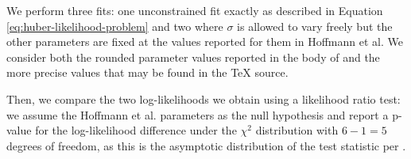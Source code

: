 \documentclass[twocolumn]{article}
\begin{document}
We perform three fits: one unconstrained fit exactly as described in Equation \ref{eq:huber-likelihood-problem} and two where \( \sigma \) is allowed to vary freely but the other parameters are fixed at the values reported for them in Hoffmann et al. We consider both the rounded parameter values reported in the body of \cite{hoffmann2022training} and the more precise values that may be found in the TeX source.

Then, we compare the two log-likelihoods we obtain using a likelihood ratio test: we assume the Hoffmann et al. parameters as the null hypothesis and report a p-value for the log-likelihood difference under the \( \chi^2 \) distribution with \( 6-1 = 5 \) degrees of freedom, as this is the asymptotic distribution of the test statistic per \cite{wilks1938large}.

\end{document}
